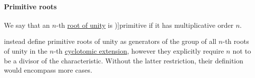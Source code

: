 \paragraph{Primitive roots}

\begin{definition}\label{def:primitive_root_of_unity}
  We say that an \( n \)-th \hyperref[def:root_of_unity]{root of unity} is \term[ru=первообразный (корень единицы) (\cite[90]{Тыртышников2017Алгебра})]{primitive} if it has multiplicative order \( n \).
\end{definition}
\begin{comments}
  \item {} instead define primitive roots of unity as generators of the group of all \( n \)-th roots of unity in the \( n \)-th \hyperref[def:cyclotomic_extension]{cyclotomic extension}, however they explicitly require \( n \) not to be a divisor of the characteristic. Without the latter restriction, their definition would encompass more cases.
\end{comments}

